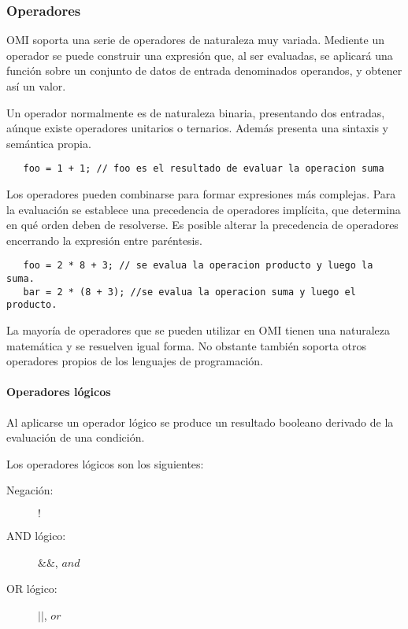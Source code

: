 \subsubsection{Operadores}
OMI soporta una serie de operadores de naturaleza muy variada. Mediente un operador se puede construir una expresión que, al ser evaluadas, se aplicará una función
sobre un conjunto de datos de entrada denominados operandos, y obtener así un valor.

Un operador normalmente es de naturaleza binaria, presentando dos entradas, aúnque existe operadores unitarios o ternarios. Además presenta una sintaxis y semántica propia. \\

\begin{lstlisting}
   foo = 1 + 1; // foo es el resultado de evaluar la operacion suma
\end{lstlisting} 

Los operadores pueden combinarse para formar expresiones más complejas. Para la evaluación se establece una precedencia de operadores implícita, que determina en qué orden 
deben de resolverse. Es posible alterar la precedencia de operadores encerrando la expresión entre paréntesis. \\

\begin{lstlisting}
   foo = 2 * 8 + 3; // se evalua la operacion producto y luego la suma.
   bar = 2 * (8 + 3); //se evalua la operacion suma y luego el producto.
\end{lstlisting} 

La mayoría de operadores que se pueden utilizar en OMI tienen una naturaleza matemática y se resuelven igual forma. No obstante también soporta otros operadores propios de
los lenguajes de programación. 

\paragraph{Operadores lógicos}\label{sec:op_bool}

Al aplicarse un operador lógico se produce un resultado booleano derivado de la evaluación de una condición. 

Los operadores lógicos son los siguientes:

\begin{description}
\item [Negación:] $!$
\item [AND lógico:] $\&\&$, $and$
\item [OR lógico:] $||$, $or$
\end{description} 


